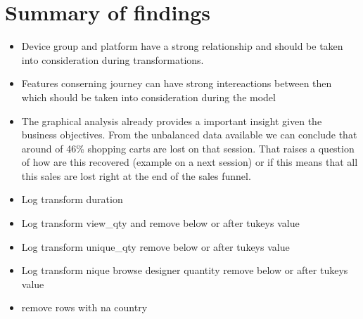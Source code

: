 \documentclass[
]{book}
\providecommand{\tightlist}{%
  \setlength{\itemsep}{0pt}\setlength{\parskip}{0pt}}
\begin{document}
\hypertarget{summary-of-findings}{%
\section{Summary of findings}\label{summary-of-findings}}

\begin{itemize}
\tightlist
\item
  Device group and platform have a strong relationship and should be taken into consideration during transformations.
\item
  Features conserning journey can have strong intereactions between then which should be taken into consideration during the model
\item
  The graphical analysis already provides a important insight given the business objectives. From the unbalanced data available we can conclude that around of 46\% shopping carts are lost on that session. That raises a question of how are this recovered (example on a next session) or if this means that all this sales are lost right at the end of the sales funnel.
\item
  Log transform duration
\item
  Log transform view\_qty and remove below or after tukeys value
\item
  Log transform unique\_qty remove below or after tukeys value
\item
  Log transform nique browse designer quantity remove below or after tukeys value
\item
  remove rows with na country
\end{itemize}

  
\end{document}
